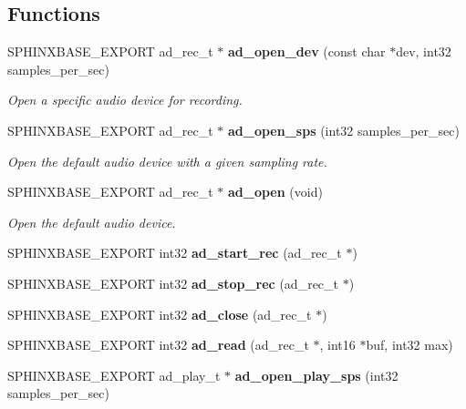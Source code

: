 \subsection*{Functions}
\begin{CompactItemize}
\item 
SPHINXBASE\_\-EXPORT ad\_\-rec\_\-t $\ast$ {\bf ad\_\-open\_\-dev} (const char $\ast$dev, int32 samples\_\-per\_\-sec)
\begin{CompactList}\small\item\em Open a specific audio device for recording. \item\end{CompactList}\item 
SPHINXBASE\_\-EXPORT ad\_\-rec\_\-t $\ast$ {\bf ad\_\-open\_\-sps} (int32 samples\_\-per\_\-sec)
\begin{CompactList}\small\item\em Open the default audio device with a given sampling rate. \item\end{CompactList}\item 
SPHINXBASE\_\-EXPORT ad\_\-rec\_\-t $\ast$ {\bf ad\_\-open} (void)\label{ad_8h_3def0da951e840fb4c72ef9259540686}

\begin{CompactList}\small\item\em Open the default audio device. \item\end{CompactList}\item 
SPHINXBASE\_\-EXPORT int32 \textbf{ad\_\-start\_\-rec} (ad\_\-rec\_\-t $\ast$)\label{ad_8h_9cb212b93cb439ba04dec2109ca043ff}

\item 
SPHINXBASE\_\-EXPORT int32 \textbf{ad\_\-stop\_\-rec} (ad\_\-rec\_\-t $\ast$)\label{ad_8h_20fb285a5f93e172f6a6e04359216aa5}

\item 
SPHINXBASE\_\-EXPORT int32 \textbf{ad\_\-close} (ad\_\-rec\_\-t $\ast$)\label{ad_8h_6bcf3ed5e9d0c2d51086cae93bc3b3fc}

\item 
SPHINXBASE\_\-EXPORT int32 \textbf{ad\_\-read} (ad\_\-rec\_\-t $\ast$, int16 $\ast$buf, int32 max)\label{ad_8h_d4a5f4ab5267003169f6d3e15e54f697}

\item 
SPHINXBASE\_\-EXPORT ad\_\-play\_\-t $\ast$ \textbf{ad\_\-open\_\-play\_\-sps} (int32 samples\_\-per\_\-sec)\label{ad_8h_89f8a1820e1c5ea658e692d2d15a7315}


\end{CompactItemize}
